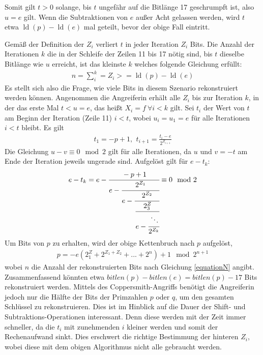 Somit gilt $t>0$ solange, bis $t$ ungefähr auf die Bitlänge 17 geschrumpft ist, also $u=e$ gilt.
Wenn die Subtraktionen von $e$ außer Acht gelassen werden, wird $t$ etwa $\operatorname{ld}(p) - \operatorname{ld}(e)$ mal geteilt, bevor der obige Fall eintritt.

Gemäß der Definition der $Z_i$ verliert $t$ in jeder Iteration $Z_i$ Bits. 
Die Anzahl der Iterationen $k$ die in der Schleife der Zeilen 11 bis 17 nötig sind, bis $t$ dieselbe Bitlänge wie $u$ erreicht, ist das kleinste $k$ welches folgende Gleichung erfüllt: 
\begin{align}
\label{equationN}
n = \sum\limits_i^k = Z_i >= \operatorname{ld}(p) - \operatorname{ld}(e)
\end{align}
Es stellt sich also die Frage, wie viele Bits in diesem Szenario rekonstruiert werden können.
Angenommen die Angreiferin erhält alle $Z_i$ bis zur Iteration $k$, in der das erste Mal $t<u=e$, das heißt $X_i=f \: \forall i < k$ gilt.
Sei $t_i$ der Wert von $t$ am Beginn der Iteration (Zeile 11) $i<t$, wobei $u_i=u_1=e$ für alle Iterationen $i<t$ bleibt.
Es gilt 
\begin{align}
t_1=-p+1 \text{, } \: t_{i+1} = \frac{t_i - e}{2^{Z_{i+1}}}
\end{align}
Die Gleichung $u-v \equiv 0 \mod 2$ gilt für alle Iterationen, da $u$ und $v=-t$ am Ende der Iteration jeweils ungerade sind.
Aufgelöst gilt für $e-t_k$:
\begin{align}
e-t_k = e- \cfrac{-p+1}{e - \cfrac{2^{Z_1}}{e- \cfrac{2^{Z_2}}{
          \cfrac{2^Z_3}{e - \cfrac{\ddots}{2^{Z_k}}}}}} \equiv 0 \mod 2
\end{align}
Um Bits von $p$ zu erhalten, wird der obige Kettenbruch nach $p$ aufgelöst,
\begin{align}
p = -e(2^Z_1+2^{Z_1+Z_2}+...+2^n)+1 \mod 2^{n+1}
\end{align}
wobei $n$ die Anzahl der rekonstruierten Bits nach Gleichung \ref{equationN} angibt.
Zusammenfassend könnten etwa $bitlen(p)-bitlen(e)=bitlen(p)-17$ Bits rekonstruiert werden.
Mittels des Coppersmith-Angriffs \cite{CoppersmithBound} benötigt die Angreiferin jedoch nur die Hälfte der Bits der Primzahlen $p$ oder $q$, um den gesamten Schlüssel zu rekonstruieren.
Dies ist im Hinblick auf die Dauer der Shift- und Subtraktions-Operationen interessant. 
Denn diese werden mit der Zeit immer schneller, da die $t_i$ mit zunehmenden $i$ kleiner werden und somit der Rechenaufwand sinkt.
Dies erschwert die richtige Bestimmung der hinteren $Z_i$, wobei diese mit dem obigen Algorithmus nicht alle gebraucht werden.


